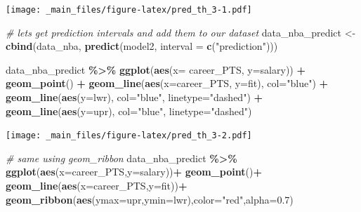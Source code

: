 \documentclass[
]{book}
\newenvironment{Shaded}{\begin{snugshade}}{\end{snugshade}}
\newcommand{\AttributeTok}[1]{\textcolor[rgb]{0.13,0.29,0.53}{#1}}
\newcommand{\CommentTok}[1]{\textcolor[rgb]{0.56,0.35,0.01}{\textit{#1}}}
\newcommand{\FloatTok}[1]{\textcolor[rgb]{0.00,0.00,0.81}{#1}}
\newcommand{\FunctionTok}[1]{\textcolor[rgb]{0.13,0.29,0.53}{\textbf{#1}}}
\newcommand{\NormalTok}[1]{#1}
\newcommand{\OtherTok}[1]{\textcolor[rgb]{0.56,0.35,0.01}{#1}}
\newcommand{\SpecialCharTok}[1]{\textcolor[rgb]{0.81,0.36,0.00}{\textbf{#1}}}
\newcommand{\StringTok}[1]{\textcolor[rgb]{0.31,0.60,0.02}{#1}}
\begin{document}
\texttt{[image: \_main\_files/figure-latex/pred\_th\_3-1.pdf]}

\begin{Shaded}
\begin{Highlighting}[]
\CommentTok{\# let\textquotesingle{}s get prediction intervals and add them to our dataset}
\NormalTok{data\_nba\_predict }\OtherTok{\textless{}{-}} \FunctionTok{cbind}\NormalTok{(data\_nba, }\FunctionTok{predict}\NormalTok{(model2, }\AttributeTok{interval =} \FunctionTok{c}\NormalTok{(}\StringTok{"prediction"}\NormalTok{)))}

\NormalTok{data\_nba\_predict }\SpecialCharTok{\%\textgreater{}\%}
  \FunctionTok{ggplot}\NormalTok{(}\FunctionTok{aes}\NormalTok{(}\AttributeTok{x=}\NormalTok{ career\_PTS, }\AttributeTok{y=}\NormalTok{salary)) }\SpecialCharTok{+}
  \FunctionTok{geom\_point}\NormalTok{() }\SpecialCharTok{+}
  \FunctionTok{geom\_line}\NormalTok{(}\FunctionTok{aes}\NormalTok{(}\AttributeTok{x=}\NormalTok{career\_PTS, }\AttributeTok{y=}\NormalTok{fit),}
            \AttributeTok{col=}\StringTok{"blue"}\NormalTok{) }\SpecialCharTok{+}
  \FunctionTok{geom\_line}\NormalTok{(}\FunctionTok{aes}\NormalTok{(}\AttributeTok{y=}\NormalTok{lwr),}
                \AttributeTok{col=}\StringTok{"blue"}\NormalTok{,}
                \AttributeTok{linetype=}\StringTok{"dashed"}\NormalTok{) }\SpecialCharTok{+}
  \FunctionTok{geom\_line}\NormalTok{(}\FunctionTok{aes}\NormalTok{(}\AttributeTok{y=}\NormalTok{upr),}
                \AttributeTok{col=}\StringTok{"blue"}\NormalTok{,}
                \AttributeTok{linetype=}\StringTok{"dashed"}\NormalTok{)}
\end{Highlighting}
\end{Shaded}

\texttt{[image: \_main\_files/figure-latex/pred\_th\_3-2.pdf]}

\begin{Shaded}
\begin{Highlighting}[]
\CommentTok{\# same using geom\_ribbon}
\NormalTok{data\_nba\_predict }\SpecialCharTok{\%\textgreater{}\%}
\FunctionTok{ggplot}\NormalTok{(}\FunctionTok{aes}\NormalTok{(}\AttributeTok{x=}\NormalTok{career\_PTS,}\AttributeTok{y=}\NormalTok{salary))}\SpecialCharTok{+}
  \FunctionTok{geom\_point}\NormalTok{()}\SpecialCharTok{+}
  \FunctionTok{geom\_line}\NormalTok{(}\FunctionTok{aes}\NormalTok{(}\AttributeTok{x=}\NormalTok{career\_PTS,}\AttributeTok{y=}\NormalTok{fit))}\SpecialCharTok{+}
  \FunctionTok{geom\_ribbon}\NormalTok{(}\FunctionTok{aes}\NormalTok{(}\AttributeTok{ymax=}\NormalTok{upr,}\AttributeTok{ymin=}\NormalTok{lwr),}\AttributeTok{color=}\StringTok{"red"}\NormalTok{,}\AttributeTok{alpha=}\FloatTok{0.7}\NormalTok{)}
\end{Highlighting}
\end{Shaded}
\end{document}

